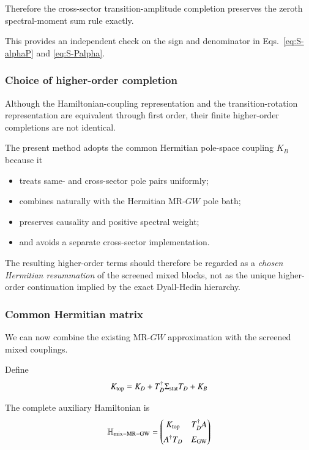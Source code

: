 \documentclass[aip,jcp,reprint,noshowkeys,superscriptaddress]{revtex4-1}
\begin{document}
Therefore the cross-sector transition-amplitude completion preserves
the zeroth spectral-moment sum rule exactly.

This provides an independent check on the sign and denominator in
Eqs.~\eqref{eq:S-alphaP} and \eqref{eq:S-Palpha}.


\subsubsection{Choice of higher-order completion}

Although the Hamiltonian-coupling representation and the
transition-rotation representation are equivalent through first order,
their finite higher-order completions are not identical.

The present method adopts the common Hermitian pole-space coupling
$K_B$ because it
\begin{itemize}
  \item treats same- and cross-sector pole pairs uniformly;
  \item combines naturally with the Hermitian MR-$GW$ pole bath;
  \item preserves causality and positive spectral weight;
  \item and avoids a separate cross-sector implementation.
\end{itemize}

The resulting higher-order terms should therefore be regarded as a
\emph{chosen Hermitian resummation} of the screened mixed blocks, not
as the unique higher-order continuation implied by the exact
Dyall-Hedin hierarchy.


\subsubsection{Common Hermitian matrix}

We can now combine the existing MR-$GW$ approximation with the
screened mixed couplings.

Define
\begin{equation}
  K_{\rm top}
  =
  K_D
  +
  T_D^\dagger
  \Sigma_{\rm stat}
  T_D
  +
  K_B
  \label{eq:K-top-final}
\end{equation}

The complete auxiliary Hamiltonian is
\begin{equation}
  \mathbb H_{\rm mix-MR-GW}
  =
  \begin{pmatrix}
    K_{\rm top}
    &
    T_D^\dagger A
    \\[2mm]
    A^\dagger T_D
    &
    E_{\rm GW}
  \end{pmatrix}
  \label{eq:H-common-final}
\end{equation}
\end{document}
